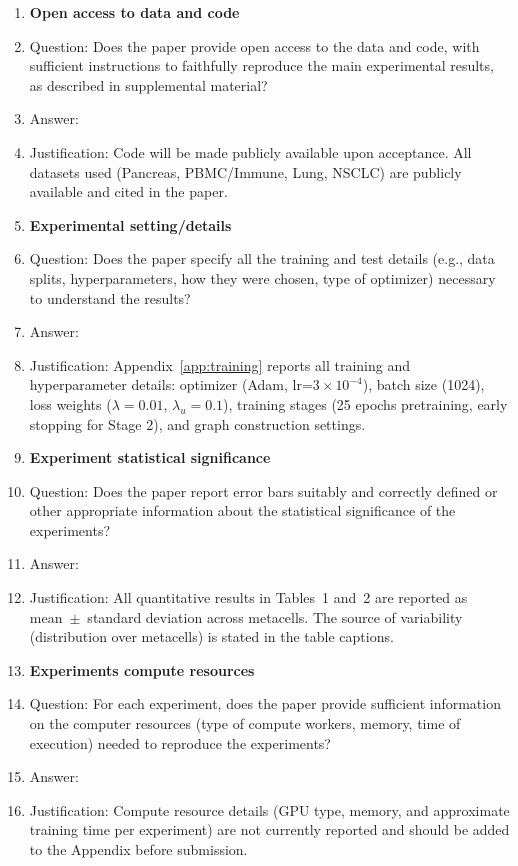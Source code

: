\begin{enumerate}
\item {\bf Open access to data and code}
    \item[] Question: Does the paper provide open access to the data and code, with sufficient instructions to faithfully reproduce the main experimental results, as described in supplemental material?
    \item[] Answer: \answerNo{}
    \item[] Justification: Code will be made publicly available upon acceptance. All datasets used (Pancreas, PBMC/Immune, Lung, NSCLC) are publicly available and cited in the paper.

\item {\bf Experimental setting/details}
    \item[] Question: Does the paper specify all the training and test details (e.g., data splits, hyperparameters, how they were chosen, type of optimizer) necessary to understand the results?
    \item[] Answer: \answerYes{}
    \item[] Justification: Appendix~\ref{app:training} reports all training and hyperparameter details: optimizer (Adam, lr=$3\times10^{-4}$), batch size (1024), loss weights ($\lambda=0.01$, $\lambda_u=0.1$), training stages (25 epochs pretraining, early stopping for Stage 2), and graph construction settings.

\item {\bf Experiment statistical significance}
    \item[] Question: Does the paper report error bars suitably and correctly defined or other appropriate information about the statistical significance of the experiments?
    \item[] Answer: \answerYes{}
    \item[] Justification: All quantitative results in Tables~1 and~2 are reported as mean~$\pm$~standard deviation across metacells. The source of variability (distribution over metacells) is stated in the table captions.

\item {\bf Experiments compute resources}
    \item[] Question: For each experiment, does the paper provide sufficient information on the computer resources (type of compute workers, memory, time of execution) needed to reproduce the experiments?
    \item[] Answer: \answerNo{}
    \item[] Justification: Compute resource details (GPU type, memory, and approximate training time per experiment) are not currently reported and should be added to the Appendix before submission.


\end{enumerate}
